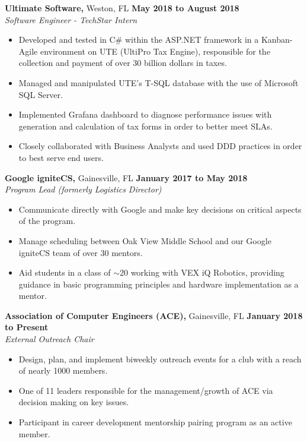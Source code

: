 \documentclass[11pt]{article} %
\begin{document}
		\noindent \textbf{Ultimate Software,} Weston, FL \hfill\textbf{May 2018 to August 2018}\\
		\textit{Software Engineer - TechStar Intern}
		\begin{itemize}[noitemsep,nolistsep, label = {-}]
			\item Developed and tested in C\# within the ASP.NET framework in a Kanban-Agile environment on UTE (UltiPro Tax Engine), responsible for the collection and payment of over 30 billion dollars in taxes.
			\item Managed and manipulated UTE's T-SQL database with the use of Microsoft SQL Server.
			\item Implemented Grafana dashboard to diagnose performance issues with generation and calculation of tax forms in order to better meet SLAs.
			\item Closely collaborated with Business Analysts and used DDD practices in order to best serve end users.
		\end{itemize}
	
		\vspace{.1cm}
		
		\noindent \textbf{Google igniteCS,} Gainesville, FL \hfill\textbf{January 2017 to May 2018}\\
		\textit{Program Lead (formerly Logistics Director)}
		\begin{itemize}[noitemsep,nolistsep, label = {-}]
			\item Communicate directly with Google and make key decisions on critical aspects of the program.
			\item Manage scheduling between Oak View Middle School and our Google igniteCS team of over 30 mentors.
			\item Aid students in a class of $\sim$20 working with VEX iQ Robotics, providing guidance in basic programming principles and hardware implementation as a mentor.
		\end{itemize} 
	
		\vspace{.1cm}
		
		\noindent \textbf{Association of Computer Engineers (ACE),} Gainesville, FL \hfill\textbf{January 2018 to Present}\\
		\textit{External Outreach Chair}
		\begin{itemize}[noitemsep,nolistsep, label={-}]
			\item Design, plan, and implement biweekly outreach events for a club with a reach of nearly 1000 members.
			\item One of 11 leaders responsible for the management/growth of ACE via decision making on key issues.
			\item Participant in career development mentorship pairing program as an active member.
		\end{itemize}
	
\end{document}
